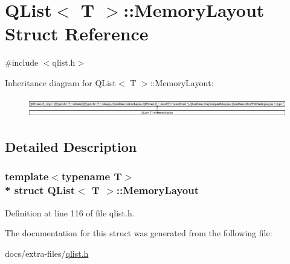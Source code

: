 \hypertarget{struct_q_list_1_1_memory_layout}{}\section{Q\+List$<$ T $>$\+:\+:Memory\+Layout Struct Reference}
\label{struct_q_list_1_1_memory_layout}


{\ttfamily \#include $<$qlist.\+h$>$}

Inheritance diagram for Q\+List$<$ T $>$\+:\+:Memory\+Layout\+:\begin{figure}[H]
\begin{center}
\leavevmode
\includegraphics[height=0.886778cm]{struct_q_list_1_1_memory_layout}
\end{center}
\end{figure}


\subsection{Detailed Description}
\subsubsection*{template$<$typename T$>$\\*
struct Q\+List$<$ T $>$\+::\+Memory\+Layout}



Definition at line 116 of file qlist.\+h.



The documentation for this struct was generated from the following file\+:\begin{DoxyCompactItemize}
\item 
docs/extra-\/files/\hyperlink{qlist_8h}{qlist.\+h}\end{DoxyCompactItemize}

